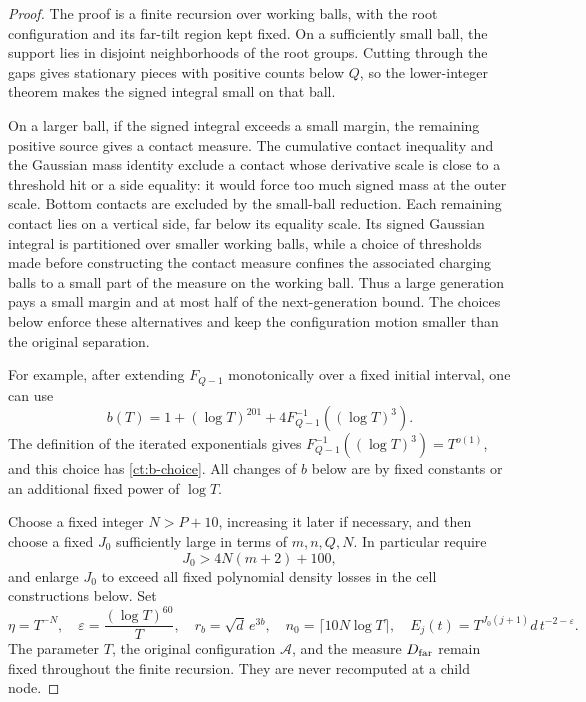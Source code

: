\begin{proof}
The proof is a finite recursion over working balls, with the root
configuration and its far-tilt region kept fixed. On a sufficiently
small ball, the support lies in disjoint neighborhoods of the root
groups. Cutting through the gaps gives stationary pieces with positive
counts below $Q$, so the lower-integer theorem makes the signed integral
small on that ball.

On a larger ball, if the signed integral exceeds a small margin, the
remaining positive source gives a contact measure.
The cumulative contact inequality and the Gaussian mass identity exclude
a contact whose derivative scale is close to a threshold hit or a side
equality: it would force too much signed mass at the outer scale.
Bottom contacts are excluded by the small-ball reduction. Each remaining
contact lies on a vertical side, far below its equality scale. Its signed
Gaussian integral is partitioned over smaller working balls, while a choice of thresholds
made before constructing the contact measure confines the associated
charging balls to a small part of the measure on the working ball. Thus a large
generation pays a small margin and at most half of the next-generation
bound. The choices below enforce these alternatives and keep the
configuration motion smaller than the original separation.

For example, after extending $F_{Q-1}$ monotonically over a fixed
initial interval, one can use
\[
 b(T)=1+(\log T)^{201}
       +4F_{Q-1}^{-1}((\log T)^3).
\]
The definition of the iterated exponentials gives
$F_{Q-1}^{-1}((\log T)^3)=T^{o(1)}$, and this choice has
\eqref{ct:b-choice}.  All changes of $b$ below are by fixed constants
or an additional fixed power of $\log T$.

Choose a fixed integer $N>P+10$, increasing it later if necessary, and
then choose a fixed $J_0$ sufficiently large in terms of $m,n,Q,N$.
In particular require
\begin{equation}\label{ct:J-choice}
 J_0>4N(m+2)+100,
\end{equation}
and enlarge $J_0$ to exceed all fixed polynomial density losses in the
cell constructions below.  Set
\begin{equation}\label{ct:recursion-parameters}
 \eta=T^{-N},\quad \varepsilon=\frac{(\log T)^{60}}{T},\quad
 r_b=\sqrt d\,e^{3b},\quad n_0=\lceil10N\log T\rceil,
 \quad E_j(t)=T^{J_0(j+1)}d\,t^{-2-\varepsilon}.
\end{equation}
The parameter $T$, the original configuration $\mathcal A$, and the
measure $D_{\rm far}$ remain fixed throughout the finite recursion.
They are never recomputed at a child node.


\end{proof}
